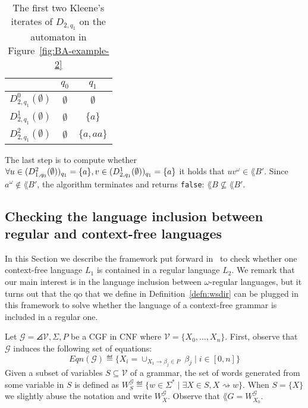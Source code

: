\begin{example}
\begin{table}[h]
\centering
\begin{tabular}{ c | c | c }
 & $q_0$ & $q_1$ \\
\hline
$D_{2,q_1}^0(\emptyset)$ & $\emptyset$ & $\emptyset$ \\
$D_{2,q_1}^1(\emptyset)$ & $\emptyset$ & $\{a\}$ \\
$D_{2,q_1}^2(\emptyset)$ & $\emptyset$ & $\{a, aa\}$ \\
\end{tabular}
\caption{The first two Kleene's iterates of $D_{2,q_1}$ on the automaton in Figure~\ref{fig:BA-example-2}}
\label{table:ex-run-D2}
\end{table}

The last step is to compute whether $\forall u \in (D_{1,q_0}^{2}(\emptyset))_{q_1}=\{a\}, v \in (D_{2,q_1}^{1}(\emptyset))_{q_1} = \{a\}$
it holds that $uv ^{\omega} \in \lang{B'}$.
Since $a ^{\omega} \notin \lang{B'}$, the algorithm terminates and returns \texttt{false}:
$\lang{B} \nsubseteq \lang{B'}$.
\end{example}

\subsection{Checking the language inclusion between regular and context-free languages}
\label{sec:checking-grammars}

In this Section we describe the framework put forward in~\cite{ganty2019language}
to check whether one context-free language $L_1$ is contained in a regular
language $L_2$.
We remark that our main interest is in the language inclusion between $\omega$-regular
languages, but it turns out that the qo that we define in Definition~\ref{defn:wsdir}
can be plugged in this framework to solve whether the language of a context-free
grammar is included in a regular one.

Let $\mathcal{G} = \angles{\mathcal{V},\Sigma,P}$ be a CGF in CNF
where $\mathcal{V} = \{X_0, \dots, X_n\}$.
First, observe that $\mathcal{G}$ induces the following set of equations:
\[ Eqn(\mathcal{G}) \eqdef \{X_i = \cup_{X_1 \rightarrow \beta_j \in P}
\; \beta_j \;|\; i \in [0,n]\} \]
Given a subset of variables $S \subseteq \mathcal{V}$ of a grammar, the set of
words generated from some variable in $S$ is defined as
$W_S^{\mathcal{G}} \eqdef \{w \in \Sigma^* \;|\; \exists X \in S, X \rightsquigarrow w\}$.
When $S = \{X\}$ we slightly abuse the notation and write $W_X^{\mathcal{G}}$.
Observe that $\lang{G} = W_{X_0}^{\mathcal{G}}$.

